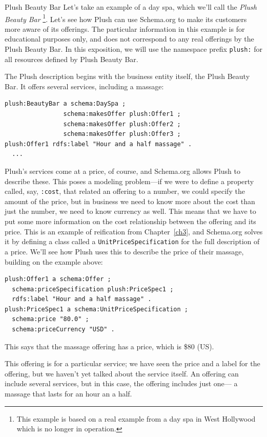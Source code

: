 \begin{example}{Plush Beauty Bar}
\label{Plushex}
Let's take an example of a day spa, which we'll call the 
\emph{Plush Beauty Bar} \footnote{This example is based on a real example from 
a day spa in West Hollywood which is no longer in operation.}.   Let's see how
Plush can use Schema.org to make its customers more aware of its
offerings. 
The particular information in this example is
for educational purposes only, and does not correspond to any real
offerings by the Plush Beauty Bar. In this exposition, we will use the
namespace prefix \texttt{plush:} for all resources defined by Plush Beauty Bar.

The Plush description begins with the business entity itself, the
Plush Beauty Bar. It offers several services,
including a massage:

\begin{lstlisting}
plush:BeautyBar a schema:DaySpa ;
                schema:makesOffer plush:Offer1 ;
                schema:makesOffer plush:Offer2 ;
                schema:makesOffer plush:Offer3 ;
plush:Offer1 rdfs:label "Hour and a half massage" .
  ...
\end{lstlisting}


Plush's services come at a price, of course, and Schema.org allows Plush to
describe these.   This poses a modeling problem---if we were to
define a property called, say, \texttt{:cost}, that related an offering to a
number, we could specify the amount of the price, but in business we
need to know more about the cost than just the number, we need to know
currency as well. This means that we have to put some more information
on the cost relationship between the offering and its price. This is an
example of reification from Chapter~\ref{ch3}, and Schema.org
solves it by defining a
class called a \texttt{UnitPriceSpecification} for the full description of a
price. We'll see how Plush uses this to describe the price of their
massage, building on the example above:

\begin{lstlisting}
plush:Offer1 a schema:Offer ;
  schema:priceSpecification plush:PriceSpec1 ;
  rdfs:label "Hour and a half massage" .
plush:PriceSpec1 a schema:UnitPriceSpecification ;
  schema:price "80.0" ;
  schema:priceCurrency "USD" .
\end{lstlisting}

This says that the massage offering has a price, which is \$80 (US).

This offering is for a particular service; we have seen the price and 
a label for the offering, 
but we haven't yet talked about the service itself.  An
offering can include several services, but in this case, the offering
includes just one--- a massage that lasts for an hour an a half.  


\end{example}
